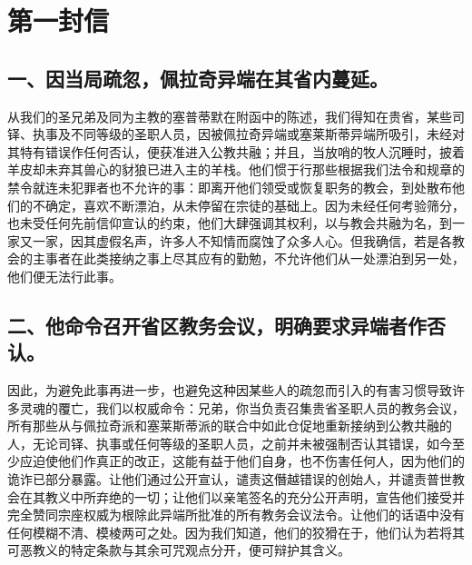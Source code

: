 
\section{第一封信}

\par


\subsection{一、因当局疏忽，佩拉奇异端在其省内蔓延。}

从我们的圣兄弟及同为主教的塞普蒂默在附函中的陈述，我们得知在贵省，某些司铎、执事及不同等级的圣职人员，因被佩拉奇异端或塞莱斯蒂异端所吸引，未经对其特有错误作任何否认，便获准进入公教共融；并且，当放哨的牧人沉睡时，披着羊皮却未弃其兽心的豺狼已进入主的羊栈。他们惯于行那些根据我们法令和规章的禁令就连未犯罪者也不允许的事：即离开他们领受或恢复职务的教会，到处散布他们的不确定，喜欢不断漂泊，从未停留在宗徒的基础上。因为未经任何考验筛分，也未受任何先前信仰宣认的约束，他们大肆强调其权利，以与教会共融为名，到一家又一家，因其虚假名声，许多人不知情而腐蚀了众多人心。但我确信，若是各教会的主事者在此类接纳之事上尽其应有的勤勉，不允许他们从一处漂泊到另一处，他们便无法行此事。\par


\subsection{二、他命令召开省区教务会议，明确要求异端者作否认。}

因此，为避免此事再进一步，也避免这种因某些人的疏忽而引入的有害习惯导致许多灵魂的覆亡，我们以权威命令：兄弟，你当负责召集贵省圣职人员的教务会议，所有那些从与佩拉奇派和塞莱斯蒂派的联合中如此仓促地重新接纳到公教共融的人，无论司铎、执事或任何等级的圣职人员，之前并未被强制否认其错误，如今至少应迫使他们作真正的改正，这能有益于他们自身，也不伤害任何人，因为他们的诡诈已部分暴露。让他们通过公开宣认，谴责这僭越错误的创始人，并谴责普世教会在其教义中所弃绝的一切；让他们以亲笔签名的充分公开声明，宣告他们接受并完全赞同宗座权威为根除此异端所批准的所有教务会议法令。让他们的话语中没有任何模糊不清、模棱两可之处。因为我们知道，他们的狡猾在于，他们认为若将其可恶教义的特定条款与其余可咒观点分开，便可辩护其含义。\par

